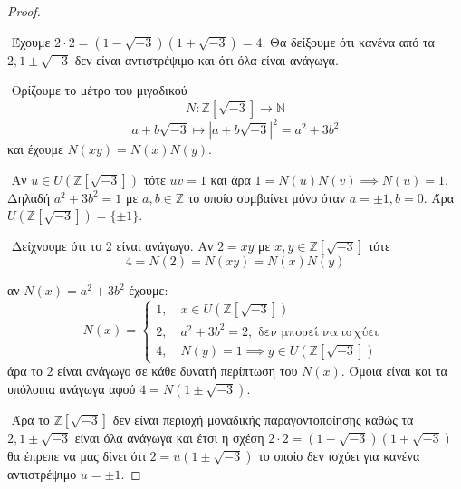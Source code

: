 \documentclass[oneside,a4paper]{article}
\newcommand{\Z}{\mathbb{Z}}
\begin{document}
\begin{proof} $ $
	
	$ $\newline
	Έχουμε $2\cdot 2 = (1-\sqrt{-3})(1+ \sqrt{-3}) = 4$. Θα δείξουμε ότι κανένα από τα $2,1\pm \sqrt{-3}$ δεν είναι αντιστρέψιμο και ότι όλα είναι ανάγωγα.
	
	$ $\newline
	Ορίζουμε το μέτρο του μιγαδικού 
	$$N : \Z [\sqrt{-3}] \longrightarrow \mathbb{N}$$
	$$a+b\sqrt{-3} \longmapsto |a+b\sqrt{-3}|^2 = a^2 + 3b^2$$
	και έχουμε $N(xy) = N(x)N(y)$. 

	$ $\newline
	Αν $u \in U(\Z[ \sqrt{-3}])$ τότε $uv=1$ και άρα $1 = N(u)N(v) \implies N(u)=1$. Δηλαδή $a^2 + 3b^2 = 1$ με $a,b \in \Z$ το οποίο συμβαίνει μόνο όταν $a=\pm 1, b=0$. Άρα $U(\Z[ \sqrt{-3}]) = \{\pm 1\}$.

	$ $\newline
	Δείχνουμε ότι το $2$ είναι ανάγωγο. Αν $2 = xy$ με $x,y \in \Z [\sqrt{-3}]$ τότε
	$$4 = N(2) = N(xy) = N(x) N(y)$$
	
	αν $N(x) = a^2 + 3b^2$ έχουμε:
	$$N(x) = 
	\begin{cases}
		1, \quad x \in U(\Z [\sqrt{-3}]) \\
		2, \quad a^2 + 3b^2 = 2, \text{ δεν μπορεί να ισχύει } \\
		4, \quad N(y) = 1 \implies y \in U(\Z [\sqrt{-3}])
	\end{cases}
	$$
	άρα το $2$ είναι ανάγωγο σε κάθε δυνατή περίπτωση του $N(x)$. Όμοια είναι και τα υπόλοιπα ανάγωγα αφού $4 = N(1\pm \sqrt{-3})$.
	
	$ $\newline
	Άρα το $\Z [\sqrt{-3}]$ δεν είναι περιοχή μοναδικής παραγοντοποίησης καθώς τα $2,1\pm \sqrt{-3}$ είναι όλα ανάγωγα και έτσι η σχέση $2\cdot 2 = (1-\sqrt{-3})(1+ \sqrt{-3})$ θα έπρεπε να μας δίνει ότι $2 = u (1 \pm \sqrt{-3})$ το οποίο δεν ισχύει για κανένα αντιστρέψιμο $u = \pm 1$.
\end{proof}
\end{document}
